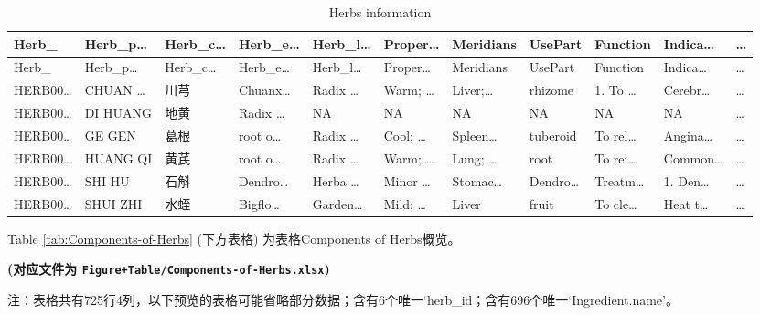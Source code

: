 \documentclass[
]{article}
\begin{document}
\begin{longtable}[]{@{}lllllllllll@{}}
\caption{\label{tab:Herbs-information}Herbs information}\tabularnewline
\toprule
Herb\_ & Herb\_p\ldots{} & Herb\_c\ldots{} & Herb\_e\ldots{} & Herb\_l\ldots{} & Proper\ldots{} & Meridians & UsePart & Function & Indica\ldots{} & \ldots{}\tabularnewline
\midrule
\endfirsthead
\toprule
Herb\_ & Herb\_p\ldots{} & Herb\_c\ldots{} & Herb\_e\ldots{} & Herb\_l\ldots{} & Proper\ldots{} & Meridians & UsePart & Function & Indica\ldots{} & \ldots{}\tabularnewline
\midrule
\endhead
HERB00\ldots{} & CHUAN \ldots{} & 川芎 & Chuanx\ldots{} & Radix \ldots{} & Warm; \ldots{} & Liver;\ldots{} & rhizome & 1. To \ldots{} & Cerebr\ldots{} & \ldots{}\tabularnewline
HERB00\ldots{} & DI HUANG & 地黄 & Radix \ldots{} & NA & NA & NA & NA & NA & NA & \ldots{}\tabularnewline
HERB00\ldots{} & GE GEN & 葛根 & root o\ldots{} & Radix \ldots{} & Cool; \ldots{} & Spleen\ldots{} & tuberoid & To rel\ldots{} & Angina\ldots{} & \ldots{}\tabularnewline
HERB00\ldots{} & HUANG QI & 黄芪 & root o\ldots{} & Radix \ldots{} & Warm; \ldots{} & Lung; \ldots{} & root & To rei\ldots{} & Common\ldots{} & \ldots{}\tabularnewline
HERB00\ldots{} & SHI HU & 石斛 & Dendro\ldots{} & Herba \ldots{} & Minor \ldots{} & Stomac\ldots{} & Dendro\ldots{} & Treatm\ldots{} & 1. Den\ldots{} & \ldots{}\tabularnewline
HERB00\ldots{} & SHUI ZHI & 水蛭 & Bigflo\ldots{} & Garden\ldots{} & Mild; \ldots{} & Liver & fruit & To cle\ldots{} & Heat t\ldots{} & \ldots{}\tabularnewline
\bottomrule
\end{longtable}

Table \ref{tab:Components-of-Herbs} (下方表格) 为表格Components of Herbs概览。

\textbf{(对应文件为 \texttt{Figure+Table/Components-of-Herbs.xlsx})}

\begin{center}\begin{tcolorbox}[colback=gray!10, colframe=gray!50, width=0.9\linewidth, arc=1mm, boxrule=0.5pt]注：表格共有725行4列，以下预览的表格可能省略部分数据；含有6个唯一`herb\_id；含有696个唯一`Ingredient.name'。
\end{tcolorbox}
\end{center}
\end{document}
